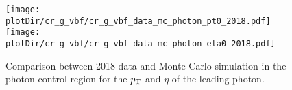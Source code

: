 \begin{figure}[htbp]
    \begin{center}
        \texttt{[image: \\plotDir/cr\_g\_vbf/cr\_g\_vbf\_data\_mc\_photon\_pt0\_2018.pdf]}
        \texttt{[image: \\plotDir/cr\_g\_vbf/cr\_g\_vbf\_data\_mc\_photon\_eta0\_2018.pdf]}
    \end{center}
    \caption{Comparison between 2018 data and Monte Carlo simulation in the photon control region for
        the $p_{\textrm{T}}$ and $\eta$ of the leading photon.}
    \label{fig:Photon2_vbfhinv_2018}
\end{figure}

\clearpage